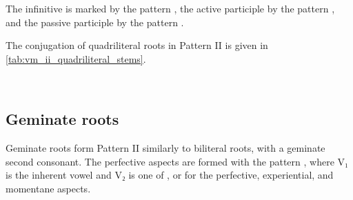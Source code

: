 \documentclass[grammar]{subfiles}
\begin{document}
The infinitive is marked by the pattern , the active participle
by the pattern , and the passive participle by the pattern
.

The conjugation of quadriliteral roots in Pattern II is given in \cref{tab:vm_ii_quadriliteral_stems}.

\begin{table}[h!]\small\capstart
  \centering
  \\
  \caption{Pattern II quadriliteral stems\label{tab:vm_ii_quadriliteral_stems}}
\end{table}


\subsection{Geminate roots}
\label{ssec:vm_ii_geminate_roots}

Geminate roots form Pattern II similarly to biliteral roots, with a geminate
second consonant.  The perfective aspects are formed with the pattern
, where V₁ is the inherent vowel and V₂ is one of ,
 or  for the perfective, experiential, and momentane aspects.  
\end{document}
